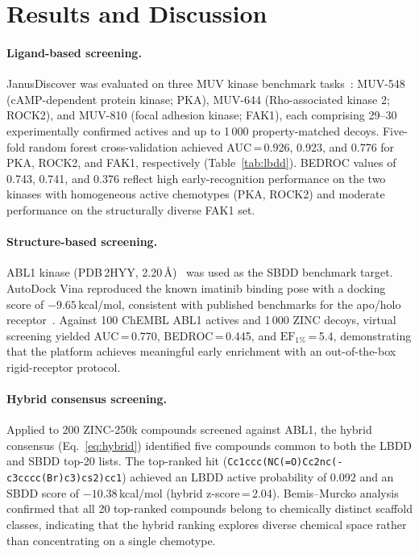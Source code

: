 \documentclass[12pt,a4paper]{article}
\begin{document}
\section*{Results and Discussion}

\paragraph{Ligand-based screening.}
JanusDiscover was evaluated on three MUV kinase benchmark
tasks~\cite{rohrer2009muv}: MUV-548 (cAMP-dependent protein kinase; PKA),
MUV-644 (Rho-associated kinase 2; ROCK2), and MUV-810 (focal adhesion
kinase; FAK1), each comprising 29--30 experimentally confirmed actives and
up to 1\,000 property-matched decoys.  Five-fold random forest
cross-validation achieved AUC\,=\,0.926, 0.923, and 0.776 for PKA, ROCK2,
and FAK1, respectively (Table~\ref{tab:lbdd}).  BEDROC values of 0.743,
0.741, and 0.376 reflect high early-recognition performance on the two
kinases with homogeneous active chemotypes (PKA, ROCK2) and moderate
performance on the structurally diverse FAK1 set.

\paragraph{Structure-based screening.}
ABL1 kinase (PDB\,2HYY, 2.20\,\AA)~\cite{nagar2002structural} was used as
the SBDD benchmark target.  AutoDock Vina reproduced the known imatinib
binding pose with a docking score of $-9.65$\,kcal/mol, consistent with
published benchmarks for the apo/holo receptor~\cite{eberhardt2021autodock}.
Against 100 ChEMBL ABL1 actives and 1\,000 ZINC decoys, virtual screening
yielded AUC\,=\,0.770, BEDROC\,=\,0.445, and $\text{EF}_{1\%}$\,=\,5.4,
demonstrating that the platform achieves meaningful early enrichment with
an out-of-the-box rigid-receptor protocol.

\paragraph{Hybrid consensus screening.}
Applied to 200 ZINC-250k compounds screened against ABL1, the hybrid
consensus (Eq.~\ref{eq:hybrid}) identified five compounds common to both
the LBDD and SBDD top-20 lists.  The top-ranked hit
(\texttt{Cc1ccc(NC(=O)Cc2nc(-c3cccc(Br)c3)cs2)cc1}) achieved an LBDD
active probability of 0.092 and an SBDD score of $-10.38$\,kcal/mol
(hybrid z-score\,=\,2.04).  Bemis--Murcko analysis confirmed that all 20
top-ranked compounds belong to chemically distinct scaffold classes,
indicating that the hybrid ranking explores diverse chemical space rather
than concentrating on a single chemotype.
\end{document}
